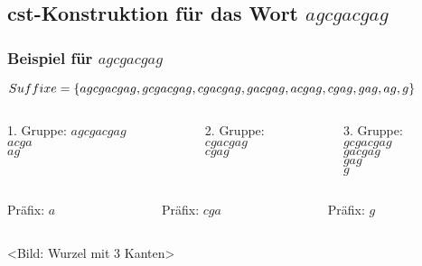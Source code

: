 \documentclass{beamer}
\begin{document}

\subsection{cst-Konstruktion für das Wort $agcgacgag$}


\begin{frame}[t]
\frametitle{Beispiel für $agcgacgag$}
$Suffixe = \{agcgacgag, gcgacgag, cgacgag, gacgag, acgag, cgag, \newline gag, ag, g\}$
\medskip
\begin{columns}
    \begin{column}[t]{0.3\textwidth}
        1. Gruppe:  
        $agcgacgag$  \\
        $acga$      \\  
        $ag$         \\ 
    \end{column}
    \begin{column}[t]{0.3\textwidth}
        2. Gruppe:        \\
        $cgacgag$   \\
        $cgag$         \\
    \end{column}
    \begin{column}[t]{0.3\textwidth}
        3. Gruppe:      \\
        $gcgacgag$ \\
        $gacgag$     \\
        $gag$           \\
        $g$               \\
    \end{column}
\end{columns}
\medskip
\begin{columns}
    \begin{column}[t]{0.3\textwidth}
        Präfix: $a$
    \end{column}
    \begin{column}[t]{0.3\textwidth}
        Präfix: $cga$
    \end{column}
    \begin{column}[t]{0.3\textwidth}
        Präfix: $g$
    \end{column}
\end{columns}
\medskip
<Bild: Wurzel mit 3 Kanten>
\end{frame}
\end{document}
